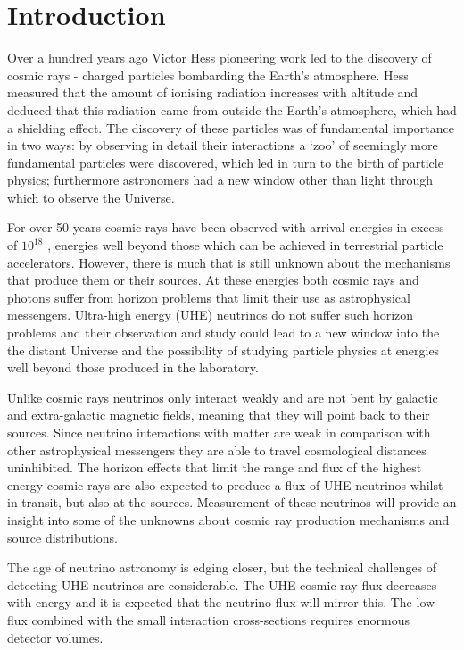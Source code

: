 \chapter{Introduction}
\label{chap:introduction}

Over a hundred years ago Victor Hess pioneering work led to the discovery of cosmic rays - charged particles bombarding the Earth's atmosphere. Hess measured that the amount of ionising radiation increases with altitude and deduced that this radiation came from outside the Earth's atmosphere, which had a shielding effect. The discovery of these particles was of fundamental importance in two ways: by observing in detail their interactions a `zoo' of seemingly more fundamental particles were discovered, which led in turn to the birth of particle physics; furthermore astronomers had a new window other than light through which to observe the Universe.

For over 50 years cosmic rays have been observed with arrival energies in excess of $10^{18}$ \eV, energies well beyond those which can be achieved in terrestrial particle accelerators. However, there is much that is still unknown about the mechanisms that produce them or their sources. At these energies both cosmic rays and photons suffer from horizon problems that limit their use as astrophysical messengers. Ultra-high energy (UHE) neutrinos do not suffer such horizon problems and their observation and study could lead to a new window into the the distant Universe and the possibility of studying particle physics at energies well beyond those produced in the laboratory. 

Unlike cosmic rays neutrinos only interact weakly and are not bent by galactic and extra-galactic magnetic fields, meaning that they will point back to their sources. Since neutrino interactions with matter are weak in comparison with other astrophysical messengers they are able to travel cosmological distances uninhibited. The horizon effects that limit the range and flux of the highest energy cosmic rays are also expected to produce a flux of UHE neutrinos whilst in transit, but also at the sources. Measurement of these neutrinos will provide an insight into some of the unknowns about cosmic ray production mechanisms and source distributions.

The age of neutrino astronomy is edging closer, but the technical challenges of detecting UHE neutrinos are considerable. The UHE cosmic ray flux decreases with energy and it is expected that the neutrino flux will mirror this. The low flux combined with the small interaction cross-sections requires enormous detector volumes.


